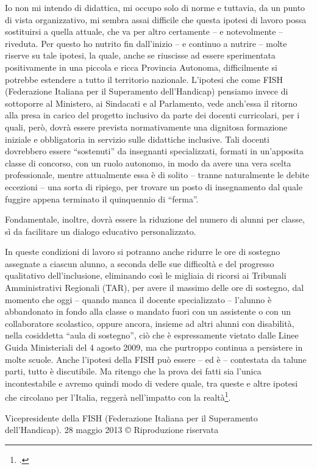 Io non mi intendo di didattica, mi occupo solo di norme e tuttavia, da un punto di vista organizzativo, mi sembra assai difficile che questa ipotesi di lavoro possa sostituirsi a quella attuale, che va per altro certamente – e notevolmente – riveduta. Per questo ho nutrito fin dall'inizio – e continuo a nutrire – molte riserve su tale ipotesi, la quale, anche se riuscisse ad essere sperimentata positivamente in una piccola e ricca Provincia Autonoma, difficilmente si potrebbe estendere a tutto il territorio nazionale.
L'ipotesi che come FISH (Federazione Italiana per il Superamento dell'Handicap) pensiamo invece di sottoporre al Ministero, ai Sindacati e al Parlamento, vede anch'essa il ritorno alla presa in carico del progetto inclusivo da parte dei docenti curricolari, per i quali, però, dovrà essere prevista normativamente una dignitosa formazione iniziale e obbligatoria in servizio sulle didattiche inclusive. Tali docenti dovrebbero essere “sostenuti” da insegnanti specializzati, formati in un'apposita classe di concorso, con un ruolo autonomo, in modo da avere una vera scelta professionale, mentre attualmente essa è di solito – tranne naturalmente le debite eccezioni – una sorta di ripiego, per trovare un posto di insegnamento dal quale fuggire appena terminato il quinquennio di “ferma”.

Fondamentale, inoltre, dovrà essere la riduzione del numero di alunni per classe, sì da facilitare un dialogo educativo personalizzato.

In queste condizioni di lavoro si potranno anche ridurre le ore di sostegno assegnate a ciascun alunno, a seconda delle sue difficoltà e del progresso qualitativo dell'inclusione, eliminando così le migliaia di ricorsi ai Tribunali Amministrativi Regionali (TAR), per avere il massimo delle ore di sostegno, dal momento che oggi – quando manca il docente specializzato – l'alunno è abbandonato in fondo alla classe o mandato fuori con un assistente o con un collaboratore scolastico, oppure ancora, insieme ad altri alunni con disabilità, nella cosiddetta “aula di sostegno”, ciò che è espressamente vietato dalle Linee Guida Ministeriali del 4 agosto 2009, ma che purtroppo continua a persistere in molte scuole.
Anche l'ipotesi della FISH può essere – ed è – contestata da talune parti, tutto è discutibile. Ma ritengo che la prova dei fatti sia l'unica incontestabile e avremo quindi modo di vedere quale, tra queste e altre ipotesi che circolano per l'Italia, reggerà nell'impatto con la realtà\footcite{nocera4}.

Vicepresidente della FISH (Federazione Italiana per il Superamento dell'Handicap).
28 maggio 2013
© Riproduzione riservata
